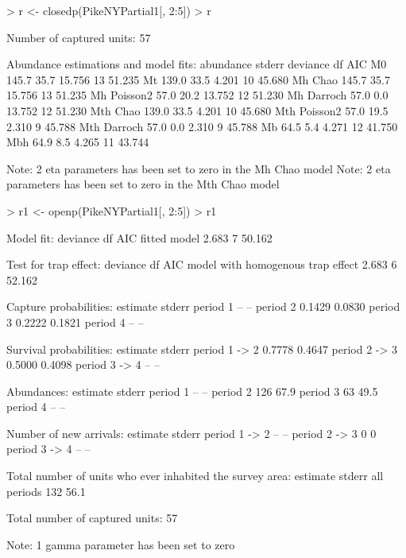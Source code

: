 \documentclass[a4paper]{article}
\begin{document}
\begin{Schunk}
\begin{Sinput}
> r <- closedp(PikeNYPartial1[, 2:5])
> r
\end{Sinput}
\begin{Soutput}
Number of captured units: 57

Abundance estimations and model fits:
              abundance  stderr  deviance  df     AIC
M0                145.7    35.7    15.756  13  51.235
Mt                139.0    33.5     4.201  10  45.680
Mh Chao           145.7    35.7    15.756  13  51.235
Mh Poisson2        57.0    20.2    13.752  12  51.230
Mh Darroch         57.0     0.0    13.752  12  51.230
Mth Chao          139.0    33.5     4.201  10  45.680
Mth Poisson2       57.0    19.5     2.310   9  45.788
Mth Darroch        57.0     0.0     2.310   9  45.788
Mb                 64.5     5.4     4.271  12  41.750
Mbh                64.9     8.5     4.265  11  43.744

Note: 2 eta parameters has been set to zero in the Mh Chao model
Note: 2 eta parameters has been set to zero in the Mth Chao model
\end{Soutput}
\begin{Sinput}
> r1 <- openp(PikeNYPartial1[, 2:5])
> r1
\end{Sinput}
\begin{Soutput}
Model fit:
              deviance      df        AIC
fitted model     2.683       7     50.162

Test for trap effect:
                                   deviance      df        AIC
model with homogenous trap effect     2.683       6     52.162

Capture probabilities:
          estimate  stderr
period 1        --      --
period 2    0.1429  0.0830
period 3    0.2222  0.1821
period 4        --      --

Survival probabilities:
               estimate  stderr
period 1 -> 2    0.7778  0.4647
period 2 -> 3    0.5000  0.4098
period 3 -> 4        --      --

Abundances:
          estimate  stderr
period 1        --      --
period 2       126    67.9
period 3        63    49.5
period 4        --      --

Number of new arrivals:
               estimate  stderr
period 1 -> 2        --      --
period 2 -> 3         0       0
period 3 -> 4        --      --

Total number of units who ever inhabited the survey area:
             estimate  stderr
all periods       132    56.1

Total number of captured units: 57

Note: 1 gamma parameter has been set to zero
\end{Soutput}
\end{Schunk}
\end{document}
